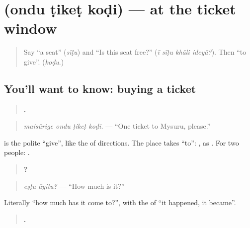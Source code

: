 \section[\texorpdfstring{\kn{ಒಂದು} \kn{ಟಿಕೆಟ್} \kn{ಕೊಡಿ} (ondu ṭikeṭ koḍi)}{ಒಂದು ಟಿಕೆಟ್ ಕೊಡಿ (ondu ṭikeṭ koḍi)}]{   (ondu ṭikeṭ koḍi) — at the ticket window}

\label{lesson:KA-C314-tiket-kodi}



\begin{quote}
Say \textquotedblleft{}a seat\textquotedblright{} (\emph{sīṭu}) and \textquotedblleft{}Is this seat free?\textquotedblright{} (\emph{ī sīṭu khāli ideyā?}). Then \textquotedblleft{}to give\textquotedblright{}. (\emph{koḍu}.)
\end{quote}

\subsection*{You'll want to know: buying a ticket}
\begin{quote}
\textbf{   .}
\end{quote}

\begin{quote}
\emph{maisūrige ondu ṭikeṭ koḍi.} — \textquotedblleft{}One ticket to Mysuru, please.\textquotedblright{}
\end{quote}

\textbf{} is the polite \textquotedblleft{}give\textquotedblright{}, like the \textbf{} of directions. The place takes \textquotedblleft{}to\textquotedblright{}: \textbf{}, as \textbf{}. For two people: \textbf{  }.

\begin{quote}
\textbf{ ?}
\end{quote}

\begin{quote}
\emph{eṣṭu āyitu?} — \textquotedblleft{}How much is it?\textquotedblright{}
\end{quote}

Literally \textquotedblleft{}how much has it come to?\textquotedblright{}, with the \textbf{} of \textquotedblleft{}it happened, it became\textquotedblright{}.

\begin{quote}
\textbf{     .}
\end{quote}

